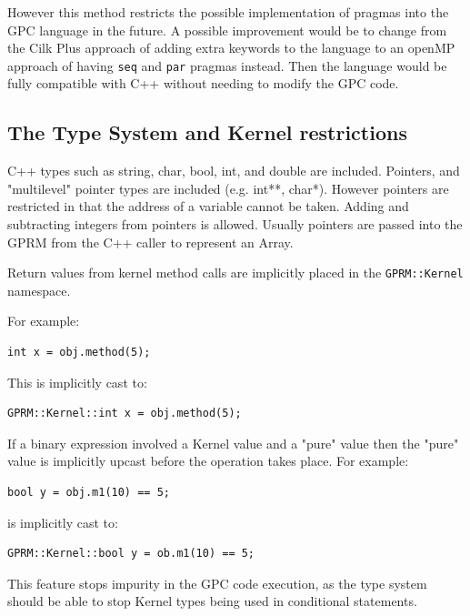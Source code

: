 However this method restricts the possible implementation of pragmas
into the GPC language in the future. A possible improvement would be to change
from the Cilk Plus approach of adding extra keywords to the language to an openMP
approach of having \texttt{seq} and \texttt{par} pragmas instead. Then the language
would be fully compatible with C++ without needing to modify the GPC code.

\subsection{The Type System and Kernel restrictions}
        C++ types such as string, char, bool, int, and double are included.
        Pointers, and "multilevel" pointer types are included (e.g. int**, char*).
        However pointers are restricted in that the address of a variable
        cannot be taken. Adding and subtracting integers
        from pointers is allowed. Usually pointers are passed into
        the GPRM from the C++ caller to represent an Array.

        Return values from kernel method calls are implicitly placed
        in the \texttt{GPRM::Kernel} namespace. 

For example:

\begin{lstlisting}[style=myGPC]
int x = obj.method(5);
\end{lstlisting}

This is implicitly cast to:

\begin{lstlisting}[style=myGPC]
GPRM::Kernel::int x = obj.method(5);
\end{lstlisting}     

If a binary expression involved a Kernel value and a "pure" value
then the "pure" value is implicitly upcast before the operation takes
place. For example:

\begin{lstlisting}[style=myGPC]
bool y = obj.m1(10) == 5;    
\end{lstlisting}

is implicitly cast to:

\begin{lstlisting}[style=myGPC]
GPRM::Kernel::bool y = ob.m1(10) == 5;
\end{lstlisting}

This feature stops impurity in the GPC code execution, as the type system
should be able to stop Kernel types being used in conditional
statements. 

